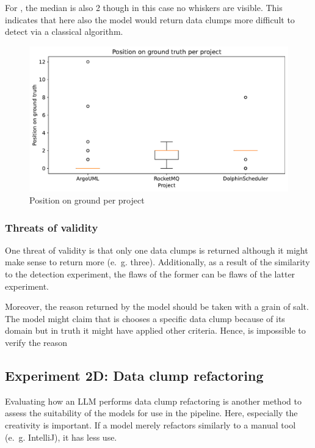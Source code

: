 For \dolphinscheduler, the median is also 2 though in this case no whiskers are visible. This indicates that here also the model would return data clumps more difficult to detect via a classical algorithm. 
\begin{figure}
    \centering
    \includegraphics[width=\columnwidth]{figures/chapter5/filter_project_position_groundtruth.pdf}
    \caption{Position on ground per project}
    \label{fig:filter_project_posgroundtruth}
\end{figure}


\subsubsection{Threats of validity}

One threat of validity is   that only one data clumps is returned although it might make sense to return more (e.~g. three). Additionally, as a result of the similarity to the detection experiment, the flaws of the former can be flaws of the latter experiment. 

Moreover, the reason returned by the model should be taken with a grain of salt. The model might claim that is chooses a specific data clump because of its domain but in truth it might have applied other criteria. Hence,  is impossible to verify the reason


\subsection{Experiment 2D: Data clump refactoring}

Evaluating how an \ac{LLM} performs data clump refactoring is another method to assess the suitability of the models for use in the pipeline. Here, especially the creativity is important. If a model merely refactors similarly to a manual tool (e.~g. IntelliJ), it has less use.

